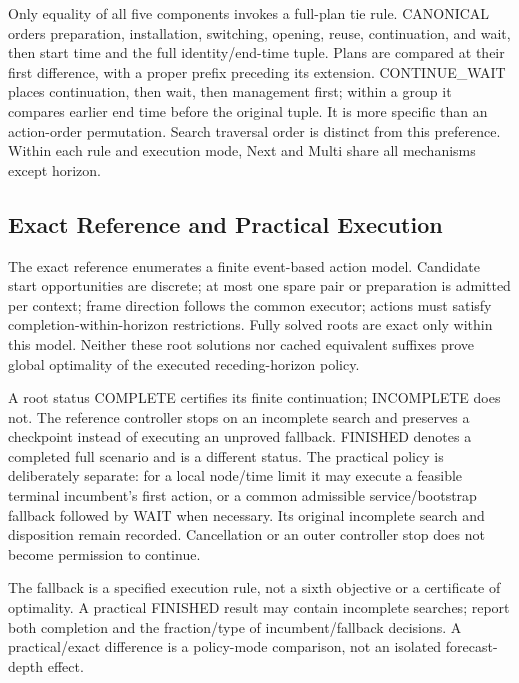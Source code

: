\documentclass[conference]{IEEEtran}
\begin{document}
Only equality of all five components invokes a full-plan tie rule. CANONICAL orders preparation, installation, switching, opening, reuse, continuation, and wait, then start time and the full identity/end-time tuple. Plans are compared at their first difference, with a proper prefix preceding its extension. CONTINUE\_WAIT places continuation, then wait, then management first; within a group it compares earlier end time before the original tuple. It is more specific than an action-order permutation. Search traversal order is distinct from this preference. Within each rule and execution mode, Next and Multi share all mechanisms except horizon.

\subsection{Exact Reference and Practical Execution}
The exact reference enumerates a finite event-based action model. Candidate start opportunities are discrete; at most one spare pair or preparation is admitted per context; frame direction follows the common executor; actions must satisfy completion-within-horizon restrictions. Fully solved roots are exact only within this model. Neither these root solutions nor cached equivalent suffixes prove global optimality of the executed receding-horizon policy.

A root status COMPLETE certifies its finite continuation; INCOMPLETE does not. The reference controller stops on an incomplete search and preserves a checkpoint instead of executing an unproved fallback. FINISHED denotes a completed full scenario and is a different status. The practical policy is deliberately separate: for a local node/time limit it may execute a feasible terminal incumbent's first action, or a common admissible service/bootstrap fallback followed by WAIT when necessary. Its original incomplete search and disposition remain recorded. Cancellation or an outer controller stop does not become permission to continue.

The fallback is a specified execution rule, not a sixth objective or a certificate of optimality. A practical FINISHED result may contain incomplete searches; report both completion and the fraction/type of incumbent/fallback decisions. A practical/exact difference is a policy-mode comparison, not an isolated forecast-depth effect.
\end{document}
